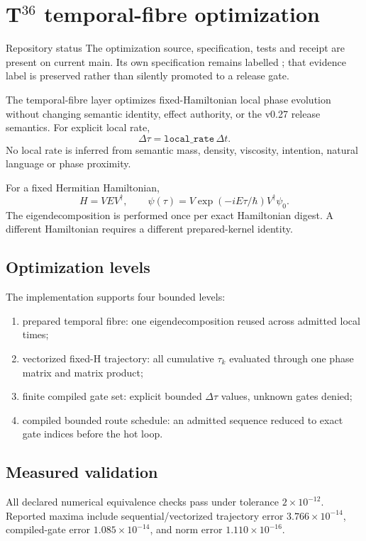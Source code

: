 \chapter{T\texorpdfstring{$^{36}$}{36} temporal-fibre optimization}

\begin{statusbox}{Repository status}
The optimization source, specification, tests and receipt are present on current main. Its own specification remains labelled ; that evidence label is preserved rather than silently promoted to a release gate.
\end{statusbox}

The temporal-fibre layer optimizes fixed-Hamiltonian local phase evolution without changing semantic identity, effect authority, or the v0.27 release semantics. For explicit local rate,
\[
\Delta\tau=\texttt{local\_rate}\,\Delta t.
\]
No local rate is inferred from semantic mass, density, viscosity, intention, natural language or phase proximity.

For a fixed Hermitian Hamiltonian,
\[
H=VEV^\dagger,
\qquad
\psi(\tau)=V\exp(-iE\tau/\hbar)V^\dagger\psi_0.
\]
The eigendecomposition is performed once per exact Hamiltonian digest. A different Hamiltonian requires a different prepared-kernel identity.

\section{Optimization levels}
The implementation supports four bounded levels:
\begin{enumerate}
\item prepared temporal fibre: one eigendecomposition reused across admitted local times;
\item vectorized fixed-H trajectory: all cumulative \(\tau_k\) evaluated through one phase matrix and matrix product;
\item finite compiled gate set: explicit bounded \(\Delta\tau\) values, unknown gates denied;
\item compiled bounded route schedule: an admitted sequence reduced to exact gate indices before the hot loop.
\end{enumerate}

\section{Measured validation}
All declared numerical equivalence checks pass under tolerance \(2\times10^{-12}\). Reported maxima include sequential/vectorized trajectory error \(3.766\times10^{-14}\), compiled-gate error \(1.085\times10^{-14}\), and norm error \(1.110\times10^{-16}\).

